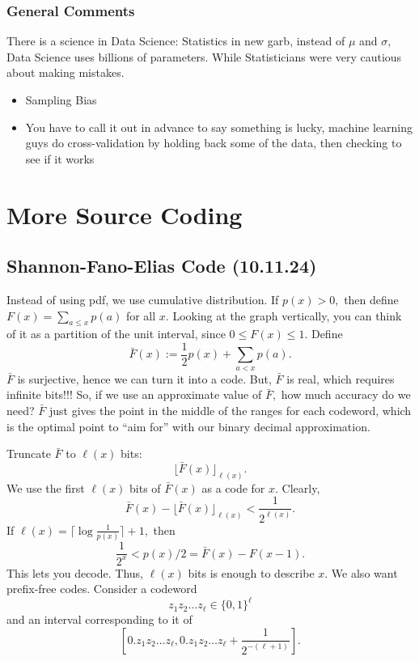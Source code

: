 \documentclass[12pt]{article}
\begin{document}
\subsubsection{General Comments}
There is a science in Data Science: Statistics in new garb, instead of $\mu$ and $\sigma,$ Data Science uses billions of parameters. While Statisticians were very cautious about making mistakes.
\begin{itemize}
\item Sampling Bias
\item You have to call it out in advance to say something is lucky, machine learning guys do cross-validation by holding back some of the data, then checking to see if it works
\end{itemize}




\section{More Source Coding}
\subsection{Shannon-Fano-Elias Code (10.11.24)}


Instead of using pdf, we use cumulative distribution. If $p(x)>0,$ then define $F(x)=\sum_{a\le x}p(a)$ for all $x.$ Looking at the graph vertically, you can think of it as a partition of the unit interval, since $0\le F(x)\le 1.$
Define
\[\bar{F}(x):=\frac{1}{2}p(x)+\sum_{a< x}p(a).\] $\bar{F}$ is surjective, hence we can turn it into a code. But, $\bar{F}$ is real, which requires infinite bits!!! So, if we use an approximate value of $\bar{F},$ how much accuracy do we need? $\bar{F}$ just gives the point in the middle of the ranges for each codeword, which is the optimal point to ``aim for'' with our binary decimal approximation.

Truncate $\bar{F}$ to $\ell(x)$ bits:
\[\lfloor\bar{F}(x)\rfloor_{\ell(x)}.\] We use the first $\ell(x)$ bits of $\bar{F}(x)$ as a code for $x.$ Clearly,
\[\bar{F}(x)-\lfloor\bar{F}(x)\rfloor_{\ell(x)}<\frac{1}{2^{\ell(x)}}.\]
If $\ell(x)=\lceil\log\frac{1}{p(x)}\rceil+1,$ then
\[\frac{1}{2^x}<p(x)/2=\bar{F}(x)-F(x-1).\] This lets you decode. Thus, $\ell(x)$ bits is enough to describe $x.$ We also want prefix-free codes. Consider a codeword
\[z_1z_2\dots z_\ell\in\{0,1\}^{\ell}\] and an interval corresponding to it of 
\[\left[0.z_1z_2\dots z_{\ell},0.z_1z_2\dots z_{\ell}+\frac{1}{2^{-(\ell+1)}}\right].\]
\end{document}
